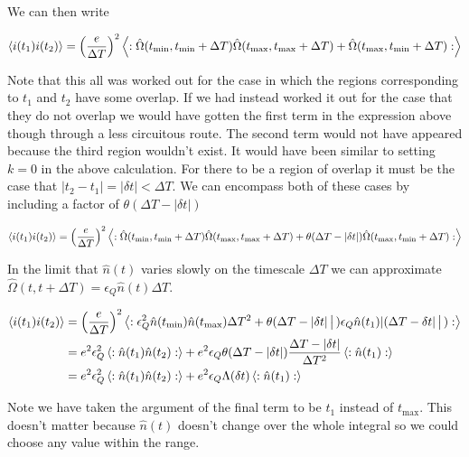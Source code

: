 \documentclass[12pt]{article}
\newcommand{\ep}{\epsilon}
\begin{document}
We can then write

\begin{align}
\Braket{i(t_1)i(t_2)} = \left(\frac{e}{\Delta T}\right)^2 \Braket{:\hat{\Omega}(t_{\text{min}},t_{\text{min}}+\Delta T)\hat{\Omega}(t_{\text{max}},t_{\text{max}}+\Delta T) + \hat{\Omega}(t_{\text{max}},t_{\text{min}}+\Delta T) :}
\end{align}

Note that this all was worked out for the case in which the regions corresponding to $t_1$ and $t_2$ have some overlap. If we had instead worked it out for the case that they do not overlap we would have gotten the first term in the expression above though through a less circuitous route. The second term would not have appeared because the third region wouldn't exist. It would have been similar to setting $k=0$ in the above calculation. For there to be a region of overlap it must be the case that $|t_2-t_1|=|\delta t|<\Delta T$. We can encompass both of these cases by including a factor of $\theta(\Delta T-\lvert\delta t \rvert)$

\begin{align}
\Braket{i(t_1)i(t_2)} = \left(\frac{e}{\Delta T}\right)^2 \Braket{:\hat{\Omega}(t_{\text{min}},t_{\text{min}}+\Delta T)\hat{\Omega}(t_{\text{max}},t_{\text{max}}+\Delta T) + \theta(\Delta T-\lvert\delta t\rvert) \hat{\Omega}(t_{\text{max}},t_{\text{min}}+\Delta T) :}
\end{align}

In the limit that $\hat{n}(t)$ varies slowly on the timescale $\Delta T$ we can approximate $\hat{\Omega}(t,t+\Delta T) = \ep_Q \hat{n}(t) \Delta T$.

\begin{align}
\Braket{i(t_1)i(t_2)} &= \left(\frac{e}{\Delta T}\right)^2 \Braket{:\ep_Q^2\hat{n}(t_{\text{min}})\hat{n}(t_{\text{max}})\Delta T^2 + \theta(\Delta T-\lvert \delta t\rvert|)\ep_Q\hat{n}(t_1)\lvert (\Delta T-\delta t \rvert|):}\\
&=e^2 \ep_Q^2 \Braket{:\hat{n}(t_1)\hat{n}(t_2):} + e^2 \ep_Q \theta(\Delta T-\lvert \delta t\rvert) \frac{\Delta T-\lvert \delta t\rvert}{\Delta T^2} \braket{:\hat{n}(t_1):}\\
&=e^2 \ep_Q^2 \Braket{:\hat{n}(t_1)\hat{n}(t_2):} + e^2 \ep_Q \Lambda(\delta t) \braket{:\hat{n}(t_1):}
\end{align}

Note we have taken the argument of the final term to be $t_1$ instead of $t_{\text{max}}$. This doesn't matter because $\hat{n}(t)$ doesn't change over the whole integral so we could choose any value within the range.
\end{document}
